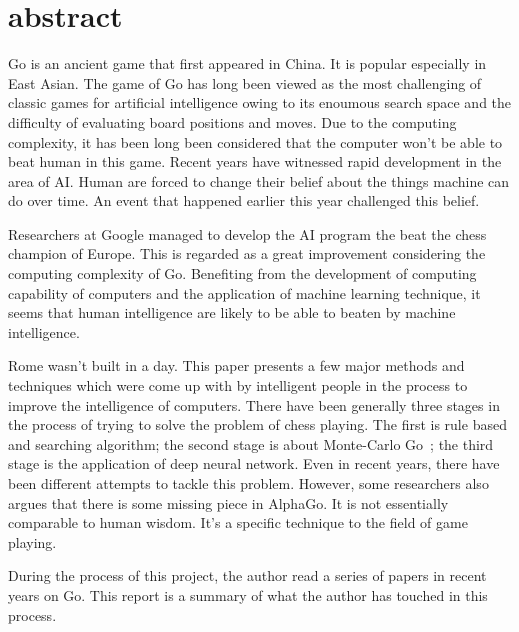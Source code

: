 \section{abstract}
Go is an ancient game that first appeared in China. It is popular especially in East Asian. The game of Go has long been viewed as the most challenging of classic games for artificial intelligence owing to its enoumous search space and the difficulty of evaluating board positions and moves. Due to the computing complexity, it has been long been considered that the computer won't be able to beat human in this game. Recent years have witnessed rapid development in the area of AI. Human are forced to change their belief about the things machine can do over time. An event that happened earlier this year challenged this belief.

Researchers at Google managed to develop the AI program the beat the chess champion of Europe. This is regarded as a great improvement considering the computing complexity of Go. Benefiting from the development of computing capability of computers and the application of machine learning technique, it seems that human intelligence are likely to be able to beaten by machine intelligence. 

Rome wasn't built in a day. This paper presents a few major methods and techniques which were come up with by intelligent people in the process to improve the intelligence of computers. There have been generally three stages in the process of trying to solve the problem of chess playing. The first is rule based and searching algorithm; the second stage is about Monte-Carlo Go~\cite{brugmann1993monte, enzenberger2010fuego}; the third stage is the application of deep neural network. Even in recent years, there have been different attempts to tackle this problem. However, some researchers also argues that there is some missing piece in AlphaGo. It is not essentially comparable to human wisdom. It's a specific technique to the field of game playing.

During the process of this project, the author read a series of papers in recent years on Go. This report is a summary of what the author has touched in this process.
